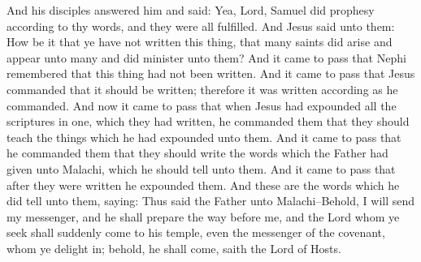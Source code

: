 \bverse \iffalse And his disciples answered him and said: Yea, Lord, Samuel did prophesy according to thy words, and they were all fulfilled. \fi
And his disciples answered him and said: Yea, Lord, Samuel did prophesy according to thy words, and they were all fulfilled.
\bverse \iffalse And Jesus said unto them: How be it that ye have not written this thing, that many saints did arise and appear unto many and did minister unto them? \fi
And Jesus said unto them: How be it that ye have not written this thing, that many saints did arise and appear unto many and did minister unto them?
\bverse \iffalse And it came to pass that Nephi remembered that this thing had not been written. \fi
And it came to pass that Nephi remembered that this thing had not been written.
\bverse \iffalse And it came to pass that Jesus commanded that it should be written; therefore it was written according as he commanded. \fi
And it came to pass that Jesus commanded that it should be written; therefore it was written according as he commanded.
\bverse \iffalse And now it came to pass that when Jesus had expounded all the scriptures in one, which they had written, he commanded them that they should teach the things which he had expounded unto them. \fi
And now it came to pass that when Jesus had expounded all the scriptures in one, which they had written, he commanded them that they should teach the things which he had expounded unto them.
\bchapter
\bverse \iffalse And it came to pass that he commanded them that they should write the words which the Father had given unto Malachi, which he should tell unto them. And it came to pass that after they were written he expounded them. And these are the words which he did tell unto them, saying: Thus said the Father unto Malachi--Behold, I will send my messenger, and he shall prepare the way before me, and the Lord whom ye seek shall suddenly come to his temple, even the messenger of the covenant, whom ye delight in; behold, he shall come, saith the Lord of Hosts. \fi
And it came to pass that he commanded them that they should write the words which the Father had given unto Malachi, which he should tell unto them. And it came to pass that after they were written he expounded them. And these are the words which he did tell unto them, saying: Thus said the Father unto Malachi--Behold, I will send my messenger, and he shall prepare the way before me, and the Lord whom ye seek shall suddenly come to his temple, even the messenger of the covenant, whom ye delight in; behold, he shall come, saith the Lord of Hosts.

